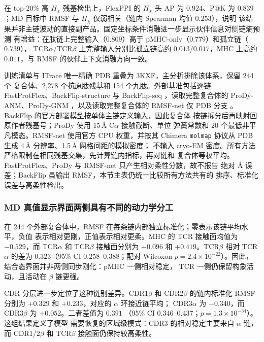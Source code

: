 

在 top-20\% 高 $H_\chi$ 残基检出上，FlexPPI 的 $H_\chi$ 头 AP 为 $0.924$、P@K 为
$0.839$；MD 目标中 RMSF 与 $H_\chi$ 仅弱相关（链内 Spearman 均值 $0.253$），说明
该结果并非主链波动的直接副产品。固定坐标条件消融进一步显示伙伴信息对侧链熵预测
有增益：在肽链上完整输入（$0.809$）高于 pMHC-only（$0.779$）和孤立链（$0.739$），
TCR$\alpha$/TCR$\beta$ 上完整输入分别比孤立链高约 $0.013$/$0.017$，MHC 上高约
$0.011$，与 RMSF 的伙伴上下文消融方向一致。

训练清单与 ITrace 唯一精确 PDB 重叠为 3KXF，主分析排除该体系，保留 244 个
复合体、2,278 个抗原肽残基和 154 个九肽。外部基准包括逐链
FastProtFlex\cite{praznikar2026fast}、BackFlip-structure 与 BackFlip-seq
\cite{viliuga2025backflip}，读取完整复合体的 ProDy-ANM、ProDy-GNM
\cite{zhang2021prody}，以及读取完整复合体的 RMSF-net 仅 PDB 分支
\cite{song2024rmsfnet}。BackFlip 的官方部署模型按单体主链定义输入，因此复合体
按链拆分后再映射回原作者残基号；ProDy 使用 15\,\AA{} C$\alpha$ 接触截断、单位
弹簧常数和 20 个最低非平凡模态。RMSF-net 使用官方 CPU 权重，并按其 Chimera
\texttt{molmap} 协议从 PDB 生成 4\,\AA{} 分辨率、1.5\,\AA{} 网格间距的模拟密度；
不输入 cryo-EM 密度。所有方法严格限制在相同残基交集，先计算链内指标，再对链和
复合体等权平均。FastProtFlex、ProDy 与 RMSF-net 只产生相对柔性分数，故不报告
绝对 \AA{} 误差；BackFlip 虽输出 RMSF，本节主表仍统一比较所有方法共有的
排序、标准化误差与高柔性检出。

\subsubsection{MD 真值显示界面两侧具有不同的动力学分工}

在 244 个外部复合体中，RMSF 在每条链内部独立标准化；零表示该链平均水平，负值
表示相对更刚，正值表示相对更柔。MHC 的 TCR 接触面均值为 $-0.529$，而
TCR$\alpha$ 和 TCR$\beta$ 接触面分别为 $+0.096$ 和 $+0.419$。TCR$\beta$
相对 TCR$\alpha$ 的差为 $0.323$（95\% CI $0.258$--$0.388$；配对 Wilcoxon
$p=2.4\times10^{-22}$）。因此，结合态界面并非两侧同步刚化：pMHC 一侧相对稳定，
TCR 一侧仍保留构象活动，且活动在 $\beta$ 链更强。

CDR 分层进一步定位了这种链别差异。CDR1$\beta$ 和 CDR2$\beta$ 的链内标准化
RMSF 分别为 $+0.329$ 和 $+0.233$，对应的 $\alpha$ 环接近链平均；
CDR3$\alpha$ 为 $-0.340$，而 CDR3$\beta$ 为 $+0.052$。二者差值为 $0.391$
（95\% CI $0.346$--$0.437$；$p=1.3\times10^{-34}$）。这组结果定义了模型
需要恢复的区域级模式：CDR3 的相对稳定主要来自 $\alpha$ 链，而
CDR1/2$\beta$ 和 TCR$\beta$ 接触面仍保持较高柔性。


